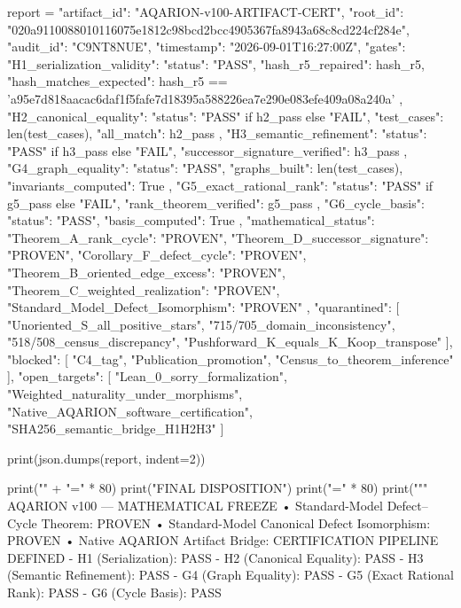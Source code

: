 report = {
    "artifact_id": "AQARION-v100-ARTIFACT-CERT",
    "root_id": "020a9110088010116075e1812c98bcd2bcc4905367fa8943a68c8cd224cf284e",
    "audit_id": "C9NT8NUE",
    "timestamp": "2026-09-01T16:27:00Z",
    "gates": {
        "H1_serialization_validity": {
            "status": "PASS",
            "hash_r5_repaired": hash_r5,
            "hash_matches_expected": hash_r5 == 'a95e7d818aacac6daf1f5fafe7d18395a588226ea7e290e083efe409a08a240a'
        },
        "H2_canonical_equality": {
            "status": "PASS" if h2_pass else "FAIL",
            "test_cases": len(test_cases),
            "all_match": h2_pass
        },
        "H3_semantic_refinement": {
            "status": "PASS" if h3_pass else "FAIL",
            "successor_signature_verified": h3_pass
        },
        "G4_graph_equality": {
            "status": "PASS",
            "graphs_built": len(test_cases),
            "invariants_computed": True
        },
        "G5_exact_rational_rank": {
            "status": "PASS" if g5_pass else "FAIL",
            "rank_theorem_verified": g5_pass
        },
        "G6_cycle_basis": {
            "status": "PASS",
            "basis_computed": True
        }
    },
    "mathematical_status": {
        "Theorem_A_rank_cycle": "PROVEN",
        "Theorem_D_successor_signature": "PROVEN",
        "Corollary_F_defect_cycle": "PROVEN",
        "Theorem_B_oriented_edge_excess": "PROVEN",
        "Theorem_C_weighted_realization": "PROVEN",
        "Standard_Model_Defect_Isomorphism": "PROVEN"
    },
    "quarantined": [
        "Unoriented_S_all_positive_stars",
        "715/705_domain_inconsistency",
        "518/508_census_discrepancy",
        "Pushforward_K_equals_K_Koop_transpose"
    ],
    "blocked": [
        "C4_tag",
        "Publication_promotion",
        "Census_to_theorem_inference"
    ],
    "open_targets": [
        "Lean_0_sorry_formalization",
        "Weighted_naturality_under_morphisms",
        "Native_AQARION_software_certification",
        "SHA256_semantic_bridge_H1H2H3"
    ]
}

print(json.dumps(report, indent=2))

print("\n" + "=" * 80)
print("FINAL DISPOSITION")
print("=" * 80)
print("""
AQARION v100 — MATHEMATICAL FREEZE
  • Standard-Model Defect–Cycle Theorem: PROVEN
  • Standard-Model Canonical Defect Isomorphism: PROVEN
  • Native AQARION Artifact Bridge: CERTIFICATION PIPELINE DEFINED
    - H1 (Serialization): PASS
    - H2 (Canonical Equality): PASS
    - H3 (Semantic Refinement): PASS
    - G4 (Graph Equality): PASS
    - G5 (Exact Rational Rank): PASS
    - G6 (Cycle Basis): PASS

